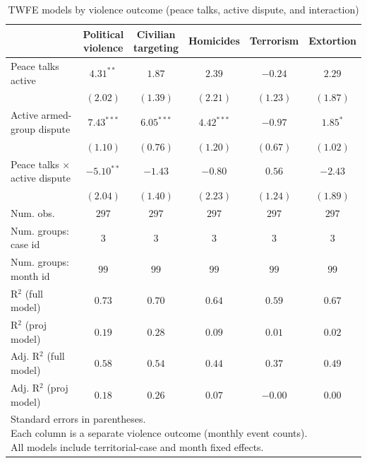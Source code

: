 
\begin{table}
\caption{TWFE models by violence outcome (peace talks, active dispute, and interaction)}
\begin{center}
\begin{tabular}{l c c c c c}
\toprule
 & \makecell{Political\\violence} & \makecell{Civilian\\targeting} & Homicides & Terrorism & Extortion \\
\midrule
Peace talks active           & $4.31^{**}$  & $1.87$       & $2.39$       & $-0.24$  & $2.29$     \\
                             & $(2.02)$     & $(1.39)$     & $(2.21)$     & $(1.23)$ & $(1.87)$   \\
Active armed-group dispute   & $7.43^{***}$ & $6.05^{***}$ & $4.42^{***}$ & $-0.97$  & $1.85^{*}$ \\
                             & $(1.10)$     & $(0.76)$     & $(1.20)$     & $(0.67)$ & $(1.02)$   \\
Peace talks × active dispute & $-5.10^{**}$ & $-1.43$      & $-0.80$      & $0.56$   & $-2.43$    \\
                             & $(2.04)$     & $(1.40)$     & $(2.23)$     & $(1.24)$ & $(1.89)$   \\
\midrule
Num. obs.                    & $297$        & $297$        & $297$        & $297$    & $297$      \\
Num. groups: case id        & $3$          & $3$          & $3$          & $3$      & $3$        \\
Num. groups: month id       & $99$         & $99$         & $99$         & $99$     & $99$       \\
R$^2$ (full model)           & $0.73$       & $0.70$       & $0.64$       & $0.59$   & $0.67$     \\
R$^2$ (proj model)           & $0.19$       & $0.28$       & $0.09$       & $0.01$   & $0.02$     \\
Adj. R$^2$ (full model)      & $0.58$       & $0.54$       & $0.44$       & $0.37$   & $0.49$     \\
Adj. R$^2$ (proj model)      & $0.18$       & $0.26$       & $0.07$       & $-0.00$  & $0.00$     \\
\bottomrule
\multicolumn{6}{l}{\scriptsize{\parbox{\linewidth}{Standard errors in parentheses.\\[0.35em] Each column is a separate violence outcome (monthly event counts).\\[0.35em] All models include territorial-case and month fixed effects.}}}
\end{tabular}
\label{tab:violence_twfe_interaction}
\end{center}
\end{table}
